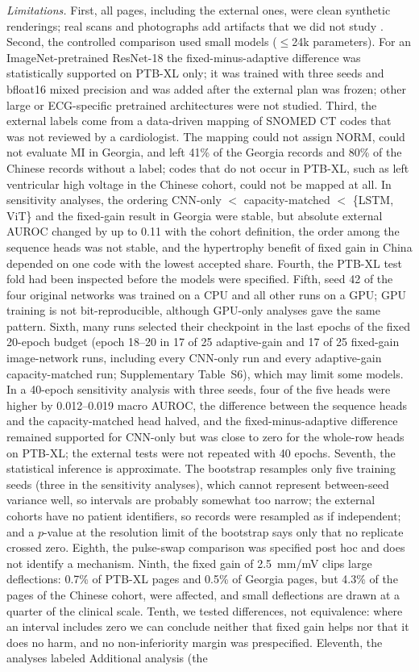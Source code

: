 \documentclass{wlscirep}
\begin{document}
\emph{Limitations.} First, all pages, including the external ones, were clean synthetic renderings; real scans and photographs add artifacts that we did not study \cite{shivashankara2024ecgimagekit,reyna2024challenge}. Second, the controlled comparison used small models ($\le$24k parameters). For an ImageNet-pretrained ResNet-18 the fixed-minus-adaptive difference was statistically supported on PTB-XL only; it was trained with three seeds and bfloat16 mixed precision and was added after the external plan was frozen; other large or ECG-specific pretrained architectures were not studied. Third, the external labels come from a data-driven mapping of SNOMED CT codes that was not reviewed by a cardiologist. The mapping could not assign NORM, could not evaluate MI in Georgia, and left 41\% of the Georgia records and 80\% of the Chinese records without a label; codes that do not occur in PTB-XL, such as left ventricular high voltage in the Chinese cohort, could not be mapped at all. In sensitivity analyses, the ordering CNN-only $<$ capacity-matched $<$ \{LSTM, ViT\} and the fixed-gain result in Georgia were stable, but absolute external AUROC changed by up to 0.11 with the cohort definition, the order among the sequence heads was not stable, and the hypertrophy benefit of fixed gain in China depended on one code with the lowest accepted share. Fourth, the PTB-XL test fold had been inspected before the models were specified. Fifth, seed 42 of the four original networks was trained on a CPU and all other runs on a GPU; GPU training is not bit-reproducible, although GPU-only analyses gave the same pattern. Sixth, many runs selected their checkpoint in the last epochs of the fixed 20-epoch budget (epoch 18--20 in 17 of 25 adaptive-gain and 17 of 25 fixed-gain image-network runs, including every CNN-only run and every adaptive-gain capacity-matched run; Supplementary Table~S6), which may limit some models. In a 40-epoch sensitivity analysis with three seeds, four of the five heads were higher by 0.012--0.019 macro AUROC, the difference between the sequence heads and the capacity-matched head halved, and the fixed-minus-adaptive difference remained supported for CNN-only but was close to zero for the whole-row heads on PTB-XL; the external tests were not repeated with 40 epochs. Seventh, the statistical inference is approximate. The bootstrap resamples only five training seeds (three in the sensitivity analyses), which cannot represent between-seed variance well, so intervals are probably somewhat too narrow; the external cohorts have no patient identifiers, so records were resampled as if independent; and a $p$-value at the resolution limit of the bootstrap says only that no replicate crossed zero. Eighth, the pulse-swap comparison was specified post hoc and does not identify a mechanism. Ninth, the fixed gain of 2.5~mm/mV clips large deflections: 0.7\% of PTB-XL pages and 0.5\% of Georgia pages, but 4.3\% of the pages of the Chinese cohort, were affected, and small deflections are drawn at a quarter of the clinical scale. Tenth, we tested differences, not equivalence: where an interval includes zero we can conclude neither that fixed gain helps nor that it does no harm, and no non-inferiority margin was prespecified. Eleventh, the analyses labeled Additional analysis (the 
\end{document}
